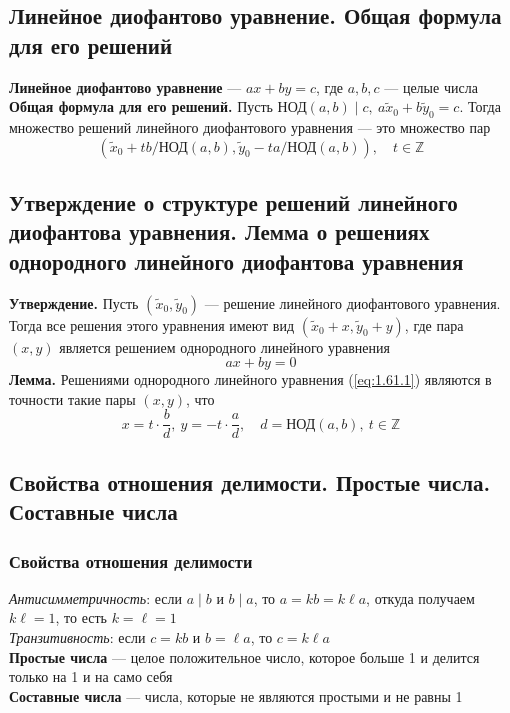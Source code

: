 \documentclass[a4paper]{article}
\begin{document}
\subsection{Линейное диофантово уравнение. Общая формула для его решений}
\textbf{Линейное диофантово уравнение} — $ax + by = c$, где $a, b, c$ — целые числа\\[2mm]
\indent\textbf{Общая формула для его решений.} Пусть НОД$(a, b) \mid c,\ a \tilde{x}_0+b \tilde{y}_0=c$. Тогда множество решений линейного диофантового уравнения — это множество пар
$$
\left(\tilde{x}_0+t b / \text {НОД}(a, b), \tilde{y}_0-t a / \text {НОД}(a, b)\right), \quad t \in \mathbb{Z}
$$

\subsection{Утверждение о структуре решений линейного диофантова уравнения. Лемма о решениях однородного линейного диофантова уравнения}
\textbf{Утверждение.} Пусть $\left(\tilde{x}_0,\tilde{y}_0\right)$ — решение линейного диофантового уравнения. Тогда все решения этого уравнения имеют вид $\left(\tilde{x}_0+x,\tilde{y}_0+y\right)$, где пара $(x, y)$ является решением однородного линейного уравнения
\begin{equation}
    ax+by=0 \tag{1.61.1}\label{eq:1.61.1}
\end{equation}
\indent\textbf{Лемма.} Решениями однородного линейного уравнения (\ref{eq:1.61.1}) являются в точности такие пары $(x, y)$, что
$$x=t\cdot\frac{b}{d},\ y=-t\cdot\frac{a}{d},\quad d=\text{НОД}(a,b),\ t\in\mathbb{Z}$$

\subsection{Свойства отношения делимости. Простые числа. Составные числа}
\subsubsection*{Свойства отношения делимости} \textit{Антисимметричность}: если $a \mid b$ и $b \mid a$, то $a = kb = k\ell a$, откуда получаем $k\ell = 1$, то есть $k = \ell = 1$\\[2mm]
\indent\textit{Транзитивность}: если $c = kb$ и $b = \ell a$, то $c = k\ell a$\\[2mm]
\indent\textbf{Простые числа} — целое положительное число, которое больше 1 и делится только на 1 и на само себя\\[2mm]
\indent\textbf{Составные числа} — числа, которые не являются простыми и не равны 1
\end{document}
